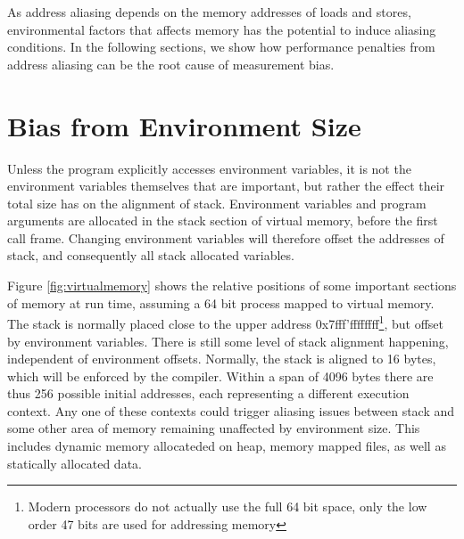 \documentclass[a4paper,10pt,twocolumn,twoside]{article}
\begin{document}
As address aliasing depends on the memory addresses of loads and stores, environmental factors that affects memory has the potential to induce aliasing conditions.
In the following sections, we show how performance penalties from address aliasing can be the root cause of measurement bias.



\section{Bias from Environment Size}

Unless the program explicitly accesses environment variables, it is not the environment variables themselves that are important, but rather the effect their total size has on the alignment of stack.
Environment variables and program arguments are allocated in the stack section of virtual memory, before the first call frame.
Changing environment variables will therefore offset the addresses of stack, and consequently all stack allocated variables.

Figure \ref{fig:virtualmemory} shows the relative positions of some important sections of memory at run time, assuming a 64 bit process mapped to virtual memory. 
The stack is normally placed close to the upper address 0x7fff'ffffffff\footnote{Modern processors do not actually use the full 64 bit space, only the low order 47 bits are used for addressing memory}, but offset by environment variables.
There is still some level of stack alignment happening, independent of environment offsets. 
Normally, the stack is aligned to 16 bytes, which will be enforced by the compiler. %
Within a span of 4096 bytes there are thus 256 possible initial addresses, each representing a different execution context.
Any one of these contexts could trigger aliasing issues between stack and some other area of memory remaining unaffected by environment size.
This includes dynamic memory allocateded on heap, memory mapped files, as well as statically allocated data. 
\end{document}
